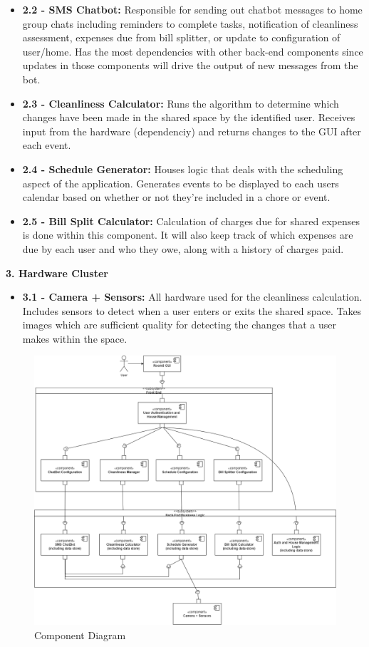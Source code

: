 \documentclass{scrreprt}
\theoremstyle{definition}
\begin{document}
\begin{flushleft}
\begin{itemize}
  	\item \textbf{2.2 - SMS Chatbot:} Responsible for sending out chatbot messages to home group chats including reminders to complete tasks, notification of cleanliness assessment, expenses due from bill splitter, or update to configuration of user/home. Has the most dependencies with other back-end components since updates in those components will drive the output of new messages from the bot.
  	\item \textbf{2.3 - Cleanliness Calculator:} Runs the algorithm to determine which changes have been made in the shared space by the identified user. Receives input from the hardware (dependenciy) and returns changes to the GUI after each event.
  	\item \textbf{2.4 - Schedule Generator:} Houses logic that deals with the scheduling aspect of the application. Generates events to be displayed to each users calendar based on whether or not they're included in a chore or event.
  	\item \textbf{2.5 - Bill Split Calculator:} Calculation of charges due for shared expenses is done within this component. It will also keep track of which expenses are due by each user and who they owe, along with a history of charges paid.
  \end{itemize}
  \item \textbf{3. Hardware Cluster}
  \begin{itemize}
  	\item \textbf{3.1 - Camera + Sensors:} All hardware used for the cleanliness calculation. Includes sensors to detect when a user enters or exits the shared space. Takes images which are sufficient quality for detecting the changes that a user makes within the space.
  \end{itemize}
\end{flushleft}

\begin{figure}[H]
    \includegraphics[width=\linewidth]{./img/component-diagram.png}
    \caption{Component Diagram}
    \label{fig: High level component diagram}
\end{figure}
\end{document}
